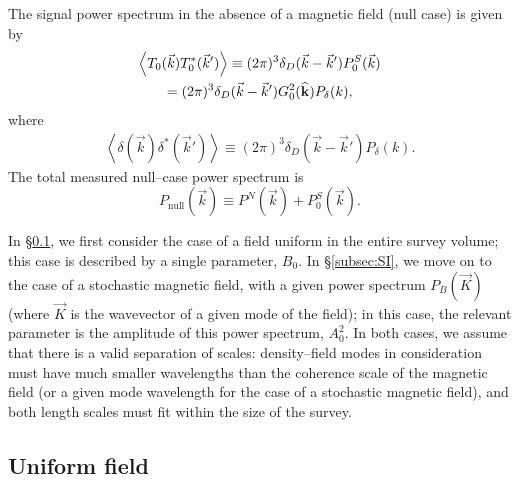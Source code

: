 \documentclass[aps,prd,twocolumn,floatfix,showpacs,superscriptaddress,nofootinbib]{revtex4-1}
\newcommand{\beq}{\begin{equation}}
\newcommand{\eeq}{\end{equation}}
\newcommand{\bga}{\begin{gathered}}
\newcommand{\ega}{\end{gathered}}
\begin{document}
The signal power spectrum in the absence of a magnetic field (null case) is given by
\beq
\bga
\left<T_0(\vec k)T_0^*(\vec k')\right> \equiv (2\pi)^3 \delta_D(\vec k-\vec k') P_0^S(\vec k)\\
= (2\pi)^3 \delta_D(\vec k-\vec k')G^2_0({\bf{\widehat k}})P_\delta(k),
\ega
\eeq
where 
\beq
\bga
\left<\delta(\vec k)\delta^*(\vec k')\right> \equiv (2\pi)^3 \delta_D(\vec k-\vec k') P_\delta(k).
\ega
\label{eq:Pdelta_definition}
\eeq
The total measured null--case power spectrum is
\beq
P_\text{null}(\vec k) \equiv P^N(\vec k) + P_0^S(\vec k).
\label{eq:Pnull}
\eeq

In \S\ref{subsec:uniform}, we first consider the case of a field uniform in the entire survey volume; this case is described by a single parameter, $B_0$. In \S\ref{subsec:SI}, we move on to the case of a stochastic magnetic field, with a given power spectrum $P_B(\vec K)$ (where $\vec K$ is the wavevector of a given mode of the field); in this case, the relevant parameter is the amplitude of this power spectrum, $ A_0^2$. In both cases, we assume that there is a valid separation of scales: density--field modes in consideration must have much smaller wavelengths than the coherence scale of the magnetic field (or a given mode wavelength for the case of a stochastic magnetic field), and both length scales must fit within the size of the survey.

\subsection{Uniform field}
\label{subsec:uniform}
\end{document}
